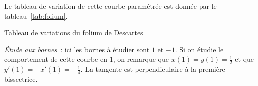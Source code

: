 Le tableau de variation de cette courbe paramétrée est donnée par le tableau~\ref{tab:folium}.


\begin{table}
    \centering   
    \caption{Tableau de variations du folium de Descartes}
    \label{tab:folium}
\end{table}

\emph{Étude aux bornes}~:
ici les bornes à étudier sont \(1\) et \(-1\). Si on étudie le comportement de cette courbe en 1, on remarque que \(x(1)=y(1)=\frac{1}{2}\) et que \(y'(1)=-x'(1)=-\frac{1}{4}\). La tangente est perpendiculaire à la première bissectrice.

